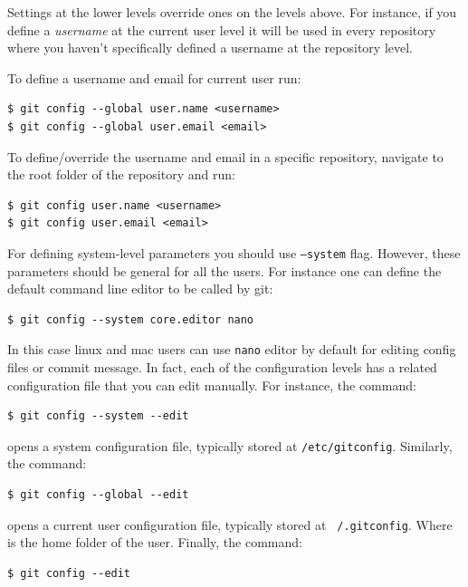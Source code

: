 \documentclass{article}
\begin{document}
Settings at the lower levels override ones on the levels above. For
instance, if you define a \emph{username} at the current user level it
will be used in every repository where you haven't specifically
defined a username at the repository level.

To define a username and email for current user run:

\begin{lstlisting}
$ git config --global user.name <username>
$ git config --global user.email <email>
\end{lstlisting}

To define/override the username and email in a specific repository,
navigate to the root folder of the repository and run:

\begin{lstlisting}
$ git config user.name <username>
$ git config user.email <email>
\end{lstlisting}

For defining system-level parameters you should use \texttt{---system}
flag. However, these parameters should be general for all the
users. For instance one can define the default command line editor to
be called by git:

\begin{lstlisting}
$ git config --system core.editor nano
\end{lstlisting}

In this case linux and mac users can use \texttt{nano} editor by
default for editing config files or commit message. In fact, each of the
configuration levels has a related configuration file that you can
edit manually. For instance, the command:

\begin{lstlisting}
$ git config --system --edit
\end{lstlisting}

opens a system configuration file, typically stored at
\texttt{/etc/gitconfig}. Similarly, the command:

\begin{lstlisting}
$ git config --global --edit
\end{lstlisting}

opens a current user configuration file, typically stored at
\texttt{~/.gitconfig}. Where \texttt{~} is the home folder of the
user. Finally, the command:

\begin{lstlisting}
$ git config --edit
\end{lstlisting}
\end{document}
